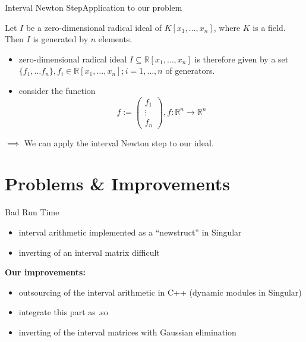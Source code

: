 \documentclass[german,10pt,xcolor=colortbl,compress]{beamer}
\begin{document}
\begin{frame}{Interval Newton Step}{Application to our problem}
    \begin{theorem}
        Let $I$ be a zero-dimensional radical ideal of $K[x_1, \hdots, x_n]$, where $K$ is
        a field. Then $I$ is generated by $n$ elements.
    \end{theorem}
    \pause

    \begin{itemize}
        \item zero-dimensional radical ideal $I \subseteq \mathbb{R}[x_1, \hdots, x_n]$ is
            therefore given by a set $\{f_1, \hdots f_n\}, f_i \in \mathbb{R}[x_1, \hdots,
            x_n]; i=1,\hdots,n$ of generators.
        \item consider the function
            \begin{equation*}
                f:= \begin{pmatrix} f_1\\ \vdots \\ f_n \end{pmatrix},
                f:\mathbb{R}^n\to \mathbb{R}^n
            \end{equation*}
    \end{itemize}
    $\implies$ We can apply the interval Newton step to our ideal.
\end{frame}

\section{Problems \& Improvements}
\begin{frame}{Bad Run Time}
    \begin{itemize}
        \item interval arithmetic implemented as a \enquote{newstruct} in Singular
        \item inverting of an interval matrix difficult
    \end{itemize}
    \bigskip
    \pause
    \textbf{Our improvements:}
    \pause
    \begin{itemize}
        \item outsourcing of the interval arithmetic in C++ (dynamic modules in Singular)
        \item integrate this part as .so
        \item inverting of the interval matrices with Gaussian elimination
    \end{itemize}
\end{frame}
\end{document}
